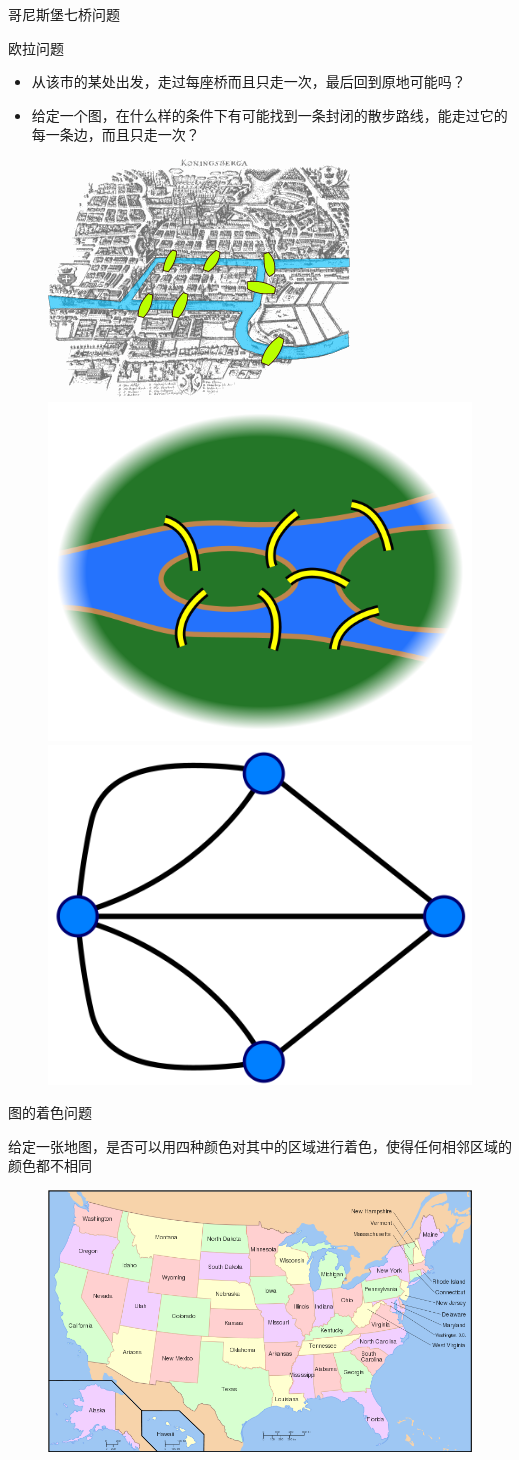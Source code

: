 \documentclass[UTF8]{ctexbeamer}
\begin{document}
\begin{frame}{哥尼斯堡七桥问题}

  \begin{block}{欧拉问题}
    \begin{itemize}
    \item 从该市的某处出发，走过每座桥而且只走一次，最后回到原地可能吗？
    \item 给定一个图，在什么样的条件下有可能找到一条封闭的散步路线，能走过它的每一条边，而且只走一次？
    \end{itemize}
  \end{block}

  \begin{figure}
    \centering
    \includegraphics[width=.3\textwidth{}]{Konigsberg_bridges.png}
    \includegraphics[width=.3\textwidth{}]{7_bridges.png}
    \includegraphics[width=.3\textwidth{}]{Konigsburg_graph.png}
  \end{figure}

\end{frame}

\begin{frame}{图的着色问题}
  \begin{block}{}
    给定一张地图，是否可以用四种颜色对其中的区域进行着色，使得任何相邻区域的颜色都不相同
  \end{block}

  \begin{figure}
    \centering
    \includegraphics[width=.6\textwidth{}]{Map_of_USA_with_state_names.png}
  \end{figure}

\end{frame}
\end{document}
